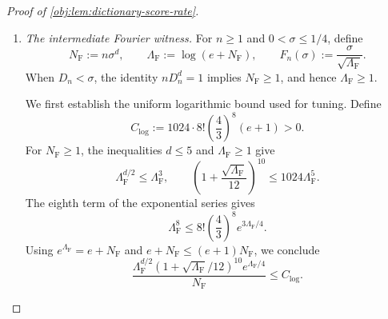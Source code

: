 \begin{proof}[Proof of \cref{obj:lem:dictionary-score-rate}]
\begin{enumerate}
For sufficiently large \(n\),
\[
0<D_n,
\qquad
n^{-2}\le D_n\le\frac18;
\]
the lower bound follows by comparing exponents, and the upper bound follows from \(D_n\to0\). Choose a dyadic bandwidth by
\[
2^{-(k+1)}<D_n\le2^{-k},
\qquad
h:=2^{-k}.
\]
Then
\[
D_n\le h<2D_n,
\qquad
n^{-2}\le h\le\frac14,
\]
so the pair belongs to the dictionary by \cref{obj:def:weight-dictionary}.

Suppose \(\sigma\le D_n\). For fixed nonnegative \(\sigma\), every factor inside \(\mathfrak s_{n,\sigma}(h)^2\) decreases as \(h\) increases. Hence
\[
\begin{aligned}
h^\beta&\le2^\beta D_n^\beta,\\
\mathfrak s_{n,\sigma}(h)
&\le\mathfrak s_{n,\sigma}(D_n)
 \le\sqrt{2^{10}e^{36}}\,D_n^\beta,
\end{aligned}
\]
where the second bound uses \(0\le\sigma/D_n\le1\) and the variance balance above. Therefore, with
\[
C_{\mathrm{direct}}
:=C_{\mathrm F,score}
\left(2^\beta+\sqrt{2^{10}e^{36}}+1\right)>0,
\]
the rounded Fourier entry satisfies
\[
A_{q_h^{\mathrm F}}^{\mathrm{ref}}
\le C_{\mathrm{direct}}D_n^\beta
=C_{\mathrm{direct}}\rho_{n,\sigma}.
\]
The equality is the direct branch of \cref{obj:def:frontier-rate}. Thus there is an integer \(n_{\mathrm{direct}}\), independent of \(\sigma\), beyond which this witness is available whenever \(\sigma\le D_n\).

\item \emph{The intermediate Fourier witness.}
For \(n\ge1\) and \(0<\sigma\le1/4\), define
\[
N_{\mathrm F}:=n\sigma^d,
\qquad
\Lambda_{\mathrm F}:=\log(e+N_{\mathrm F}),
\qquad
F_n(\sigma):=\frac{\sigma}{\sqrt{\Lambda_{\mathrm F}}}.
\]
When \(D_n<\sigma\), the identity \(nD_n^d=1\) implies \(N_{\mathrm F}\ge1\), and hence \(\Lambda_{\mathrm F}\ge1\).

We first establish the uniform logarithmic bound used for tuning. Define
\[
C_{\log}:=1024\cdot8!\left(\frac43\right)^8(e+1)>0.
\]
For \(N_{\mathrm F}\ge1\), the inequalities \(d\le5\) and \(\Lambda_{\mathrm F}\ge1\) give
\[
\Lambda_{\mathrm F}^{d/2}\le\Lambda_{\mathrm F}^3,
\qquad
\left(1+\frac{\sqrt{\Lambda_{\mathrm F}}}{12}\right)^{10}
\le1024\Lambda_{\mathrm F}^5.
\]
The eighth term of the exponential series gives
\[
\Lambda_{\mathrm F}^8
\le8!\left(\frac43\right)^8e^{3\Lambda_{\mathrm F}/4}.
\]
Using \(e^{\Lambda_{\mathrm F}}=e+N_{\mathrm F}\) and
\(e+N_{\mathrm F}\le(e+1)N_{\mathrm F}\), we conclude
\[
\frac{\Lambda_{\mathrm F}^{d/2}
\left(1+\sqrt{\Lambda_{\mathrm F}}/12\right)^{10}
e^{\Lambda_{\mathrm F}/4}}{N_{\mathrm F}}
\le C_{\log}.
\]


\end{enumerate}
\end{proof}
